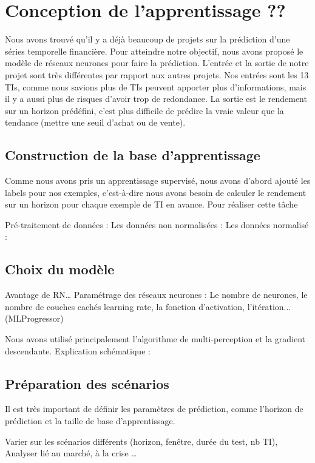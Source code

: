 \documentclass{article}
\begin{document}
\section{Conception de l'apprentissage ??}

Nous avons trouvé qu'il y a déjà beaucoup de projets sur la prédiction d'une séries temporelle financière. Pour atteindre notre objectif, nous avons proposé le modèle de réseaux neurones pour faire la prédiction. 
L'entrée et la sortie de notre projet sont très différentes par rapport aux autres projets. Nos entrées sont les 13 TIs, comme nous savions plus de TIs peuvent apporter plus d'informations, mais il y a aussi plus de risques d'avoir trop de redondance. La sortie est le rendement sur un horizon prédéfini, c'est plus difficile de prédire la vraie valeur que la tendance (mettre une seuil d'achat ou de vente).


\subsection{Construction de la base d'apprentissage}
Comme nous avons pris un apprentissage supervisé, nous avons d'abord ajouté les labels pour nos exemples, c'est-à-dire nous avons besoin de calculer le rendement sur un horizon pour chaque exemple de TI en avance. Pour réaliser cette tâche

Pré-traitement de données :
Les données non normalisées :
Les données normalisé :


\subsection{Choix du modèle}
Avantage de RN…
Paramétrage des réseaux neurones : Le nombre de neurones, le nombre de couches cachés learning rate, la fonction d'activation, l'itération... (MLProgressor)

Nous avons utilisé principalement l'algorithme de multi-perception et la gradient descendante.
Explication schématique :

\subsection{Préparation des scénarios}
Il est très important de définir les paramètres de prédiction, comme l'horizon de prédiction et la taille de base d'apprentissage. 

Varier sur les scénarios différents (horizon, fenêtre, durée du test, nb TI), Analyser lié au marché, à la crise …
\end{document}
